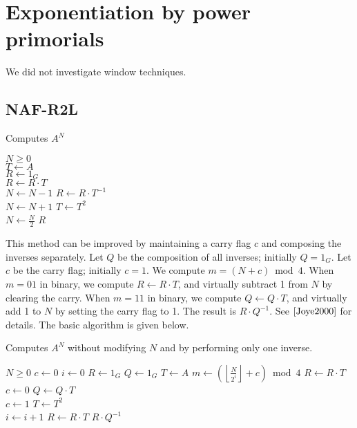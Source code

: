 \documentclass[11pt, letterpaper]{article}
\theoremstyle{definition}
\newcommand{\floor}[1]{\left\lfloor #1 \right\rfloor}
\begin{document}
\section{Exponentiation by power primorials}

We did not investigate window techniques.

\subsection{NAF-R2L}

\bigbreak
\begin{algorithm}
\caption{Computes $A^N$}
\label{NAF-R2l}
\begin{algorithmic}[1]
\REQUIRE $N \ge 0$ \\
\STATE $T \gets A$ \\
\STATE $R \gets 1_G$ \\
		\STATE $R \gets R \cdot T$ \\
		\STATE $N \gets N-1$
		\STATE $R \gets R \cdot T^{-1}$ \\
		\STATE $N \gets N+1$
	\ENDIF
	\STATE $T \gets T^2$ \\
	\STATE $N \gets \frac{N}{2}$
\ENDWHILE
\RETURN $R$
\end{algorithmic}
\end{algorithm}

\bigbreak
This method can be improved by maintaining a carry flag $c$ and composing the inverses separately.  Let $Q$ be the composition of all inverses; initially $Q=1_G$.  Let $c$ be the carry flag; initially $c=1$.  We compute $m = (N+c) \bmod 4$.  When $m = 01$ in binary, we compute $R \gets R \cdot T$, and virtually subtract 1 from $N$ by clearing the carry.  When $m = 11$ in binary, we compute $Q \gets Q \cdot T$, and virtually add 1 to $N$ by setting the carry flag to 1. The result is $R \cdot Q^{-1}$.  See $\ref{Joye2000}$ for details.  The basic algorithm is given below.

\bigbreak
\begin{algorithm}
\caption{Computes $A^N$ without modifying $N$ and by performing only one inverse.}
\label{NAF-R2l}
\begin{algorithmic}[1]
\REQUIRE $N \ge 0$
\STATE $c \gets 0$
\STATE $i \gets 0$
\STATE $R \gets 1_G$
\STATE $Q \gets 1_G$
\STATE $T \gets A$
	\STATE $m \gets \left(\floor{\frac{N}{2^i}}+c\right) \bmod 4$
		\STATE $R \gets R \cdot T$
		\STATE $c \gets 0$
		\STATE $Q \gets Q \cdot T$ \\
		\STATE $c \gets 1$
	\ENDIF
	\STATE $T \gets T^2$ \\
	\STATE $i \gets i+1$
\ENDWHILE
{} \STATE $R \gets R \cdot T$ \ENDIF
\RETURN $R \cdot Q^{-1}$
\end{algorithmic}
\end{algorithm}
\end{document}
